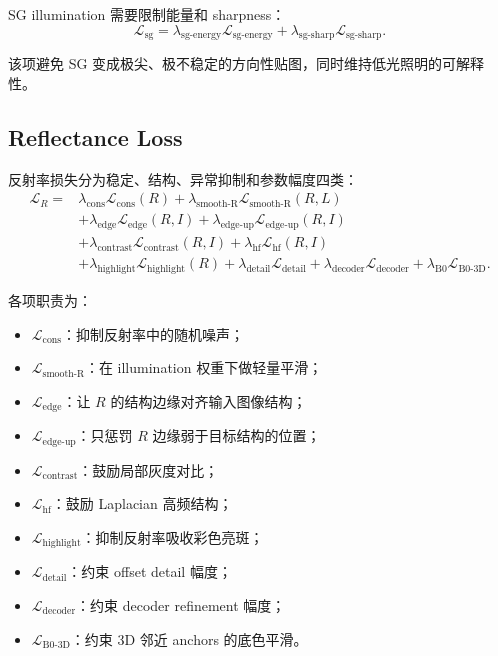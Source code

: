 \documentclass[11pt]{article}
\begin{document}
SG illumination 需要限制能量和 sharpness：
\begin{equation}
    \mathcal{L}_{\text{sg}}
    =
    \lambda_{\text{sg-energy}}
    \mathcal{L}_{\text{sg-energy}}
    +
    \lambda_{\text{sg-sharp}}
    \mathcal{L}_{\text{sg-sharp}}.
\end{equation}

该项避免 SG 变成极尖、极不稳定的方向性贴图，同时维持低光照明的可解释性。

\subsection{Reflectance Loss}

反射率损失分为稳定、结构、异常抑制和参数幅度四类：
\begin{align}
    \mathcal{L}_{R}
    ={}&
    \lambda_{\text{cons}}
    \mathcal{L}_{\text{cons}}(R)
    +
    \lambda_{\text{smooth-R}}
    \mathcal{L}_{\text{smooth-R}}(R, L)
    \nonumber \\
    &+
    \lambda_{\text{edge}}
    \mathcal{L}_{\text{edge}}(R, I)
    +
    \lambda_{\text{edge-up}}
    \mathcal{L}_{\text{edge-up}}(R, I)
    \nonumber \\
    &+
    \lambda_{\text{contrast}}
    \mathcal{L}_{\text{contrast}}(R, I)
    +
    \lambda_{\text{hf}}
    \mathcal{L}_{\text{hf}}(R, I)
    \nonumber \\
    &+
    \lambda_{\text{highlight}}
    \mathcal{L}_{\text{highlight}}(R)
    +
    \lambda_{\text{detail}}
    \mathcal{L}_{\text{detail}}
    +
    \lambda_{\text{decoder}}
    \mathcal{L}_{\text{decoder}}
    +
    \lambda_{\text{B0}}
    \mathcal{L}_{\text{B0-3D}}.
\end{align}

各项职责为：
\begin{itemize}[leftmargin=1.5em]
    \item $\mathcal{L}_{\text{cons}}$：抑制反射率中的随机噪声；
    \item $\mathcal{L}_{\text{smooth-R}}$：在 illumination 权重下做轻量平滑；
    \item $\mathcal{L}_{\text{edge}}$：让 $R$ 的结构边缘对齐输入图像结构；
    \item $\mathcal{L}_{\text{edge-up}}$：只惩罚 $R$ 边缘弱于目标结构的位置；
    \item $\mathcal{L}_{\text{contrast}}$：鼓励局部灰度对比；
    \item $\mathcal{L}_{\text{hf}}$：鼓励 Laplacian 高频结构；
    \item $\mathcal{L}_{\text{highlight}}$：抑制反射率吸收彩色亮斑；
    \item $\mathcal{L}_{\text{detail}}$：约束 offset detail 幅度；
    \item $\mathcal{L}_{\text{decoder}}$：约束 decoder refinement 幅度；
    \item $\mathcal{L}_{\text{B0-3D}}$：约束 3D 邻近 anchors 的底色平滑。
\end{itemize}
\end{document}
